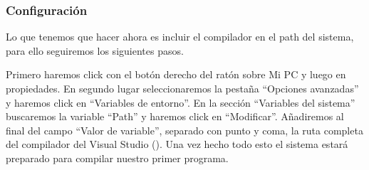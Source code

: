 \subsubsection{Configuración}
Lo que tenemos que hacer ahora es incluir el compilador  en el path del sistema, para ello
seguiremos los siguientes pasos.

Primero haremos click con el botón derecho del ratón sobre Mi PC y luego en propiedades.
En segundo lugar seleccionaremos la pestaña ``Opciones avanzadas'' y haremos click en ``Variables de entorno''.
En la sección ``Variables del sistema'' buscaremos la variable ``Path'' y haremos click en ``Modificar''.
Añadiremos al final del campo ``Valor de variable'', separado con punto y coma, la ruta completa del compilador
del Visual Studio ().
Una vez hecho todo esto el sistema estará preparado para compilar nuestro primer programa.
